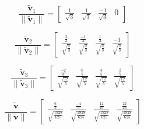 \documentclass{tufte-book}
\newcommand{\vct}{\mathbf}
\theoremstyle{mytheoremstyle}
\theoremstyle{mylemstyle}
\theoremstyle{mydefstyle}
\begin{document}
\begin{enumerate}
\[ \frac{\vct{\tilde{v}}_1}{\|\vct{\tilde{v}}_1\|} =
\begin{bmatrix}
\frac{1}{\sqrt{3}} & \frac{1}{\sqrt{3}} & \frac{-1}{\sqrt{3}} & 0
\end{bmatrix} \]

\[ \frac{\vct{\tilde{v}}_2}{\|\vct{\tilde{v}}_2\|} =
\begin{bmatrix}
\frac{\frac{2}{3}}{\sqrt{\frac{5}{3}}} &\frac{\frac{-1}{3}}{\sqrt{\frac{5}{3}}} & \frac{\frac{1}{3}}{\sqrt{\frac{5}{3}}}& \frac{-1}{\sqrt{\frac{5}{3}}}
\end{bmatrix} \]

\[ \frac{\vct{\tilde{v}}_3}{\|\vct{\tilde{v}}_3\|} =
\begin{bmatrix}
\frac{\frac{-2}{3}}{\sqrt{\frac{12}{5}}} &\frac{\frac{6}{5}}{\sqrt{\frac{12}{5}}} & \frac{\frac{4}{5}}{\sqrt{\frac{12}{5}}}& \frac{\frac{2}{5}}{\sqrt{\frac{12}{5}}}
\end{bmatrix} \]

\[ \frac{\vct{\tilde{v}}}{\|\vct{\tilde{v}}\|} =
\begin{bmatrix}
\frac{\frac{6}{5}}{\sqrt{\frac{1928}{625}}} &\frac{\frac{-4}{5}}{\sqrt{\frac{1928}{625}}} & \frac{\frac{12}{25}}{\sqrt{\frac{1928}{625}}}& \frac{\frac{22}{25}}{\sqrt{\frac{1928}{625}}}
\end{bmatrix} \]
\end{enumerate} 
\end{document}
